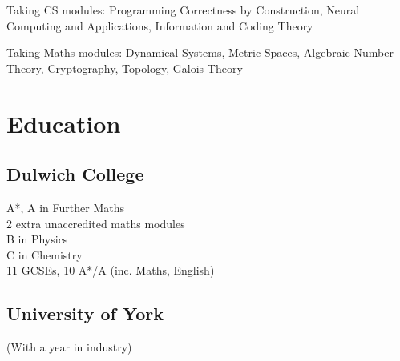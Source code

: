 \documentclass[11pt, a4paper]{cv}
\begin{document}
\begin{minipage}[t]{0.66\textwidth}
\vspace{\topsep} %
\begin{tightitemize}
\item Taking CS modules: Programming Correctness by Construction, Neural Computing and Applications, Information and Coding Theory
\item Taking Maths modules: Dynamical Systems, Metric Spaces, Algebraic Number Theory, Cryptography, Topology, Galois Theory
\end{tightitemize}

\section{Education} 

\begin{minipage}[t]{0.4\textwidth}
\subsection{Dulwich College}

A*, A in Further Maths \\
2 extra unaccredited maths modules \\
B in Physics \\
C in Chemistry \\\vspace{4pt}
11 GCSEs, 10 A*/A (inc. Maths, English)

\end{minipage}
\begin{minipage}[t]{0.55\textwidth}
\subsection{University of York}

(With a year in industry) \\\vspace{4pt}
\vspace{4pt}


\end{minipage}
\end{minipage}
\end{document}
